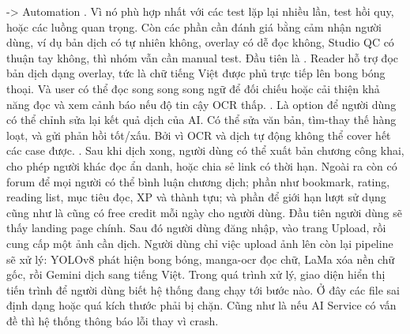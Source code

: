 {}-> Automation . Vì nó phù hợp nhất với các test lặp lại nhiều lần, test hồi quy, hoặc các luồng quan trọng. Còn các phần cần đánh giá bằng cảm nhận người dùng, ví dụ bản dịch có tự nhiên không, overlay có dễ đọc không, Studio QC có thuận tay không, thì nhóm vẫn cần manual test.\markdownRendererInterblockSeparator
{}
\markdownRendererSectionEnd \markdownRendererSectionBegin
{}\markdownRendererInterblockSeparator
{}Đầu tiên là . Reader hỗ trợ đọc bản dịch dạng overlay, tức là chữ tiếng Việt được phủ trực tiếp lên bong bóng thoại. Và user có thể đọc song song song ngữ để đối chiếu hoặc cải thiện khả năng đọc và xem cảnh báo nếu độ tin cậy OCR thấp.\markdownRendererParagraphSeparator
{}. Là option để người dùng có thể chỉnh sửa lại kết quả dịch của AI. Có thể sửa văn bản, tìm-thay thế hàng loạt, và gửi phản hồi tốt/xấu. Bởi vì OCR và dịch tự động không thể cover hết các case được.\markdownRendererParagraphSeparator
{}. Sau khi dịch xong, người dùng có thể xuất bản chương công khai, cho phép người khác đọc ẩn danh, hoặc chia sẻ link có thời hạn.\markdownRendererParagraphSeparator
{}Ngoài ra còn có forum để mọi người có thể bình luận chương dịch; phần  như bookmark, rating, reading list, mục tiêu đọc, XP và thành tựu; và phần  để giới hạn lượt sử dụng cũng như là cũng có free credit mỗi ngày cho người dùng.\markdownRendererInterblockSeparator
{}
\markdownRendererSectionEnd \markdownRendererSectionBegin
{}\markdownRendererInterblockSeparator
{}Đầu tiên người dùng sẽ thấy landing page chính. Sau đó người dùng đăng nhập, vào trang Upload, rồi cung cấp một ảnh cần dịch.\markdownRendererParagraphSeparator
{}Người dùng chỉ việc upload ảnh lên còn lại pipeline sẽ xử lý: YOLOv8 phát hiện bong bóng, manga-ocr đọc chữ, LaMa xóa nền chữ gốc, rồi Gemini dịch sang tiếng Việt. Trong quá trình xử lý, giao diện hiển thị tiến trình để người dùng biết hệ thống đang chạy tới bước nào.\markdownRendererParagraphSeparator
{}Ở đây các file sai định dạng hoặc quá kích thước phải bị chặn. Cũng như là nếu AI Service có vấn đề thì hệ thống thông báo lỗi thay vì crash.\markdownRendererInterblockSeparator
{}
\markdownRendererSectionEnd \markdownRendererSectionBegin
